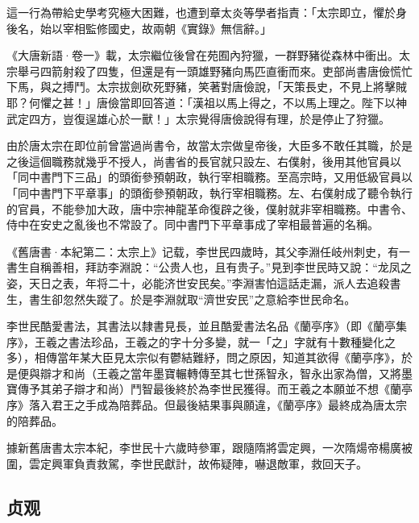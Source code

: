 這一行為帶給史學考究極大困難，也遭到章太炎等學者指責：「太宗即立，懼於身後名，始以宰相監修國史，故兩朝《實錄》無信辭。」

《大唐新語·卷一》載，太宗繼位後曾在苑囿內狩獵，一群野豬從森林中衝出。太宗舉弓四箭射殺了四隻，但還是有一頭雄野豬向馬匹直衝而來。吏部尚書唐儉慌忙下馬，與之搏鬥。太宗拔劍砍死野豬，笑著對唐儉說，「天策長史，不見上將擊賊耶？何懼之甚！」唐儉當即回答道：「漢祖以馬上得之，不以馬上理之。陛下以神武定四方，豈復逞雄心於一獸！」太宗覺得唐儉說得有理，於是停止了狩獵。

由於唐太宗在即位前曾當過尚書令，故當太宗做皇帝後，大臣多不敢任其職，於是之後這個職務就幾乎不授人，尚書省的長官就只設左、右僕射，後用其他官員以「同中書門下三品」的頭銜參預朝政，執行宰相職務。至高宗時，又用低級官員以「同中書門下平章事」的頭銜參預朝政，執行宰相職務。左、右僕射成了聽令執行的官員，不能參加大政，唐中宗神龍革命復辟之後，僕射就非宰相職務。中書令、侍中在安史之亂後也不常設了。同中書門下平章事成了宰相最普遍的名稱。

《舊唐書·本紀第二：太宗上》记载，李世民四歲時，其父李淵任岐州刺史，有一書生自稱善相，拜訪李淵說：“公贵人也，且有贵子。”見到李世民時又說：“龙凤之姿，天日之表，年将二十，必能济世安民矣。”李淵害怕這話走漏，派人去追殺書生，書生卻忽然失蹤了。於是李淵就取“濟世安民”之意給李世民命名。

李世民酷愛書法，其書法以隸書見長，並且酷愛書法名品《蘭亭序》（即《蘭亭集序》，王羲之書法珍品，王羲之的字十分多變，就一「之」字就有十數種變化之多），相傳當年某大臣見太宗似有鬱結難紓，問之原因，知道其欲得《蘭亭序》，於是便與辯才和尚（王羲之當年墨寶輾轉傳至其七世孫智永，智永出家為僧，又將墨寶傳予其弟子辯才和尚）鬥智最後終於為李世民獲得。而王羲之本願並不想《蘭亭序》落入君王之手成為陪葬品。但最後結果事與願違，《蘭亭序》最終成為唐太宗的陪葬品。

據新舊唐書太宗本紀，李世民十六歲時參軍，跟隨隋將雲定興，一次隋煬帝楊廣被圍，雲定興軍負責救駕，李世民獻計，故佈疑陣，嚇退敵軍，救回天子。


\subsection{贞观}

